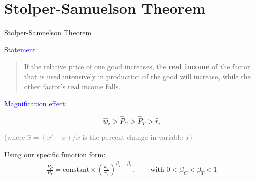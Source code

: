 \documentclass[notes,11pt, aspectratio=169, xcolor=table]{beamer}
\newcommand{\blue}[1]{\textcolor{blue}{#1}}
\newenvironment{wideitemize}{\itemize\addtolength{\itemsep}{10pt}}{\enditemize}
\begin{document}
\section{Stolper-Samuelson Theorem}

\begin{frame}{Stolper-Samuelson Theorem}

        \begin{wideitemize}
            \item \blue{Statement}:

            \begin{quote}
                If the relative price of one good increases, the \textbf{real income} of the factor that is used intensively in production of the good will increase, while the other factor’s real income falls.
            \end{quote}

            \item<2-> \blue{Magnification effect}:

            \begin{equation*}
            \hat{w}_i > \hat{P}_C > \hat{P}_T > \hat{r}_i 
         \end{equation*}

         \textcolor{gray}{(where $\hat{x} = (x'-x)/x$ is the percent change in variable $x$)}

         \item<3-> Using our specific function form:
    \begin{eqnarray*}\label{eq: goods-factor-prices}
         \frac{P_C}{P_T} = \text{constant} \times \left(  \frac{w_i}{r_i} \right)^{\beta_T - \beta_C}, \qquad \text{with } 0<\beta_C<\beta_T<1
    \end{eqnarray*}         
    
\end{wideitemize}
\end{frame}
\end{document}
